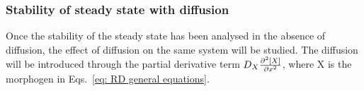 %
%
%
%
%
%


\subsubsection{Stability of steady state with diffusion}
Once the stability of the steady state has been analysed in the absence of diffusion, the effect of diffusion on the same system will be studied. The diffusion will be introduced through the partial derivative term $D_{X}\frac{\partial^{2} {[X]}}{\partial {x}^{2}}$, where X is the morphogen in Eqs.~\ref{eq: RD general equations}.
